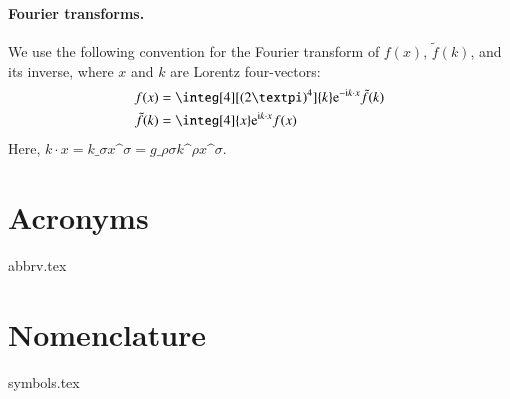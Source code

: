 \paragraph{Fourier transforms.} %
We use the following convention for the Fourier transform of $f(x)$, $\tilde{f}(k)$, and its inverse, where $x$ and $k$ are Lorentz four-vectors:
\begin{equation}
    \begin{split}
        f(x) &=  \integ[4][(2\ppi)^4]{k} \eu[-\im k\cdot x]\tilde{f}(k)  \\
        \tilde{f}(k) &= \integ[4]{x} \eu[\im k \cdot x] f(x) 
    \end{split}
\end{equation}
Here, $k\cdot x = k\_{\sigma} x\^{\sigma} = g\_{\rho\sigma} k\^{\rho} x\^{\sigma}$.



\section*{Acronyms}
{abbrv.tex}


\section*{Nomenclature}
{symbols.tex}
